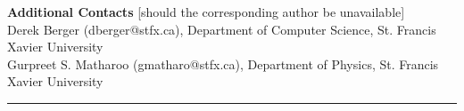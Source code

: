 \documentclass[10pt,a4paper]{article}
\begin{document}
\noindent
\textbf{Additional Contacts} [should the corresponding author be unavailable]\\
Derek Berger (dberger@stfx.ca), Department of Computer Science, St. Francis Xavier University\\
Gurpreet S. Matharoo (gmatharo@stfx.ca), Department of Physics, St. Francis Xavier University

% 

\footnotesize
\begin{center}
\noindent\rule{6cm}{0.4pt}
\end{center}

\AtNextBibliography{\footnotesize}
\printbibliography[heading=none]
\end{document}
